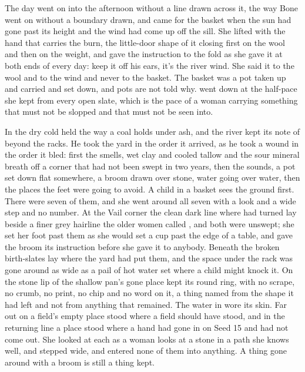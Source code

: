 The day went on into the afternoon without a line drawn across it, the way Bone went on without a boundary drawn, and  came for the basket when the sun had gone past its height and the wind had come up off the sill. She lifted with the hand that carries the burn, the little-door shape of it closing first on the wool and then on the weight, and gave the instruction to the fold as she gave it at both ends of every day: keep it off his ears, it's the river wind. She said it to the wool and to the wind and never to the basket. The basket was a pot taken up and carried and set down, and pots are not told why.  went down at the half-pace she kept from every open slate, which is the pace of a woman carrying something that must not be slopped and that must not be seen into.

In  the dry cold held the way a coal holds under ash, and the river kept its note of  beyond the racks. He took the yard in the order it arrived, as he took a wound in the order it bled: first the smells, wet clay and cooled tallow and the sour mineral breath off a corner that had not been swept in two years, then the sounds, a pot set down flat somewhere, a broom drawn over stone, water going over water, then the places the feet were going to avoid. A child in a basket sees the ground first. There were seven of them, and she went around all seven with a look and a wide step and no number. At the Vail corner the clean dark line where  had turned lay beside a finer grey hairline the older women called , and both were unswept; she set her foot past them as she would set a cup past the edge of a table, and gave the broom its instruction before she gave it to anybody. Beneath  the broken birth-slates lay where the yard had put them, and the space under the rack was gone around as wide as a pail of hot water set where a child might knock it. On the stone lip of  the shallow pan's gone place kept its round ring, with no scrape, no crumb, no print, no chip and no word on it, a thing named from the shape it had left and not from anything that remained. The water in  wore its skin. Far out on  a field's empty place stood where a field should have stood, and in the returning line a place stood where a hand had gone in on Seed 15 and had not come out. She looked at each as a woman looks at a stone in a path she knows well, and stepped wide, and entered none of them into anything. A thing gone around with a broom is still a thing kept.

